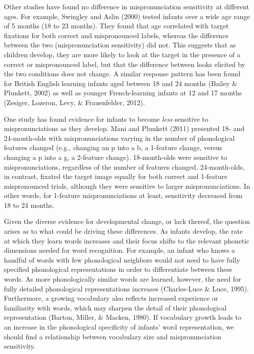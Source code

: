 \documentclass[man]{apa6}
\begin{document}
Other studies have found no difference in mispronunciation sensitivity at different ages. For example, Swingley and Aslin (2000) tested infants over a wide age range of 5 months (18 to 23 months). They found that age correlated with target fixations for both correct and mispronounced labels, whereas the difference between the two (mispronunciation sensitivity) did not. This suggests that as children develop, they are more likely to look at the target in the presence of a correct or mispronounced label, but that the difference between looks elicited by the two conditions does not change. A similar response pattern has been found for British English learning infants aged between 18 and 24 months (Bailey \& Plunkett, 2002) as well as younger French-learning infants at 12 and 17 months (Zesiger, Lozeron, Levy, \& Frauenfelder, 2012).

One study has found evidence for infants to become \emph{less} sensitive to mispronunciations as they develop. Mani and Plunkett (2011) presented 18- and 24-month-olds with mispronunciations varying in the number of phonological features changed (e.g., changing an p into a b, a 1-feature change, versus changing a p into a g, a 2-feature change). 18-month-olds were sensitive to mispronunciations, regardless of the number of features changed. 24-month-olds, in contrast, fixated the target image equally for both correct and 1-feature mispronounced trials, although they were sensitive to larger mispronunciations. In other words, for 1-feature mispronunciations at least, sensitivity decreased from 18 to 24 months.

Given the diverse evidence for developmental change, or lack thereof, the question arises as to what could be driving these differences. As infants develop, the rate at which they learn words increases and their focus shifts to the relevant phonetic dimensions needed for word recognition. For example, an infant who knows a handful of words with few phonological neighbors would not need to have fully specified phonological representations in order to differentiate between these words. As more phonologically similar words are learned, however, the need for fully detailed phonological representations increases (Charles-Luce \& Luce, 1995). Furthermore, a growing vocabulary also reflects increased experience or familiarity with words, which may sharpen the detail of their phonological representation (Barton, Miller, \& Macken, 1980). If vocabulary growth leads to an increase in the phonological specificity of infants' word representation, we should find a relationship between vocabulary size and mispronunciation sensitivity.
\end{document}
